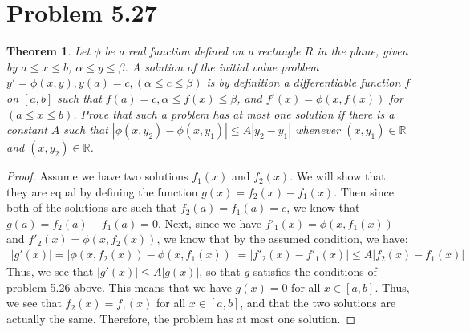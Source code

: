 \documentclass[psamsfonts]{amsart}
\newtheorem{thm}{Theorem}[section]
\theoremstyle{definition}
\theoremstyle{remark}
\numberwithin{equation}{section}
\begin{document}
\section{Problem 5.27}

\begin{thm}
Let $\phi$ be a real function defined on a rectangle $R$ in the plane, given by $a \leq x \leq b$, $\alpha \leq y \leq \beta$. A solution of the initial value problem $y' = \phi (x,y), y(a) = c, (\alpha \leq c \leq \beta)$ is by definition a differentiable function $f$ on $[a,b]$ such that $f(a) = c, \alpha \leq f(x) \leq \beta$, and $f'(x) = \phi(x,f(x))$ for $(a \leq x \leq b)$. Prove that such a  problem has at most one solution if there is a constant $A$ such that $|\phi(x,y_2) - \phi(x,y_1)| \leq A |y_2 - y_1|$ whenever $(x,y_1) \in \mathbb{R}$ and $(x, y_2) \in \mathbb{R}$.
\end{thm}

\begin{proof}
Assume we have two solutions $f_1(x)$ and $f_2(x)$. We will show that they are equal by defining the function $g(x) = f_2(x) - f_1(x)$. Then since both of the solutions are such that $f_2(a) = f_1(a) = c$, we know that $g(a) = f_2(a) - f_1(a) = 0$. Next, since we have $f'_1(x) = \phi(x, f_1(x))$ and $f'_2(x) = \phi(x,f_2(x))$, we know that by the assumed condition, we have:
\begin{eqnarray}
|g'(x)| = |\phi(x,f_2(x)) - \phi(x,f_1(x))| = |f'_2(x) - f'_1(x)| \leq A |f_2(x) - f_1(x)|
\end{eqnarray}
Thus, we see that $|g'(x)| \leq A |g(x)|$, so that $g$ satisfies the conditions of problem 5.26 above. This means that we have $g(x) = 0$ for all $x \in [a,b]$. Thus, we see that $f_2(x) = f_1(x)$ for all $x \in [a,b]$, and that the two solutions are actually the same. Therefore, the problem has at most one solution.
\end{proof}
\end{document}
